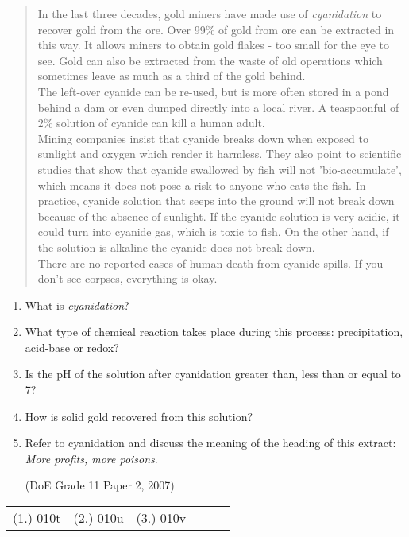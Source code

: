 \begin{eocexercises}{}
\begin{enumerate}
{\begin{quote}
{In the last three decades, gold miners have made use of \textit{cyanidation} to recover gold from the ore. Over 99\% of gold from ore can be extracted in this way. It allows miners to obtain gold flakes - too small for the eye to see. Gold can also be extracted from the waste of old operations which sometimes leave as much as a third of the gold behind.\\

The left-over cyanide can be re-used, but is more often stored in a pond behind a dam or even dumped directly into a local river. A teaspoonful of 2\% solution of cyanide can kill a human adult.\\

Mining companies insist that cyanide breaks down when exposed to sunlight and oxygen which render it harmless. They also point to scientific studies that show that cyanide swallowed by fish will not 'bio-accumulate', which means it does not pose a risk to anyone who eats the fish. In practice, cyanide solution that seeps into the ground will not break down because of the absence of sunlight. If the cyanide solution is very acidic, it could turn into cyanide gas, which is toxic to fish. On the other hand, if the solution is alkaline the cyanide does not break down.\\

There are no reported cases of human death from cyanide spills. If you don't see corpses, everything is okay.
}
\end{quote}
}
\begin{enumerate}
\item{What is \textit{cyanidation}?}
\item{What type of chemical reaction takes place during this process: precipitation, acid-base or redox?}
\item{Is the pH of the solution after cyanidation greater than, less than or equal to 7?}
\item{How is solid gold recovered from this solution?}
\item{Refer to cyanidation and discuss the meaning of the heading of this extract: \textit{More profits, more poisons}.}

(DoE Grade 11 Paper 2, 2007)
\end{enumerate}
\end{enumerate}

\practiceinfo

\begin{tabular}[h]{cccccc}
(1.) 010t & (2.) 010u & (3.) 010v & 
 \end{tabular}
\end{eocexercises}










